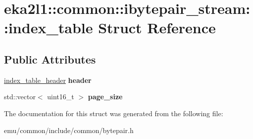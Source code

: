 \hypertarget{structeka2l1_1_1common_1_1ibytepair__stream_1_1index__table}{}\section{eka2l1\+:\+:common\+:\+:ibytepair\+\_\+stream\+:\+:index\+\_\+table Struct Reference}
\label{structeka2l1_1_1common_1_1ibytepair__stream_1_1index__table}
\subsection*{Public Attributes}
\begin{DoxyCompactItemize}
\item 
\mbox{\label{structeka2l1_1_1common_1_1ibytepair__stream_1_1index__table_a2236606ec8e1731529de11a81dbbc8b7}} 
\mbox{\hyperlink{structeka2l1_1_1common_1_1ibytepair__stream_1_1index__table__header}{index\+\_\+table\+\_\+header}} {\bfseries header}
\item 
\mbox{\label{structeka2l1_1_1common_1_1ibytepair__stream_1_1index__table_a3b3e7805b204bb261174d518c9f37c6d}} 
std\+::vector$<$ uint16\+\_\+t $>$ {\bfseries page\+\_\+size}
\end{DoxyCompactItemize}


The documentation for this struct was generated from the following file\+:\begin{DoxyCompactItemize}
\item 
emu/common/include/common/bytepair.\+h\end{DoxyCompactItemize}
